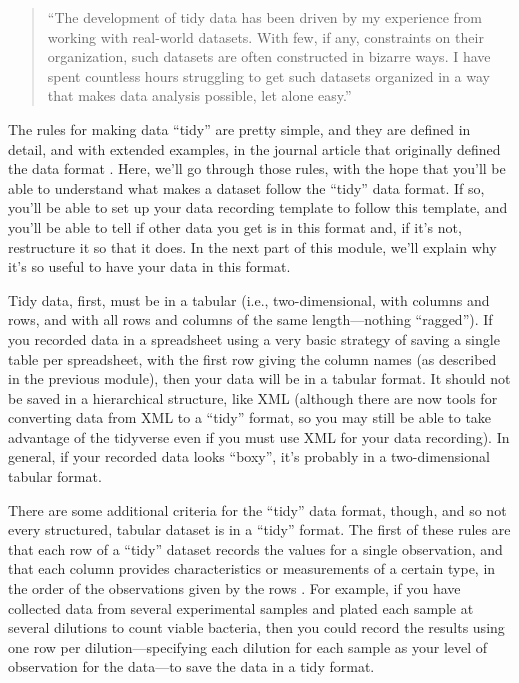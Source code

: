 \documentclass[]{tufte-book}
\begin{document}
\begin{quote}
``The development of tidy data has been driven by my experience from working
with real-world datasets. With few, if any, constraints on their organization,
such datasets are often constructed in bizarre ways. I have spent countless
hours struggling to get such datasets organized in a way that makes data
analysis possible, let alone easy.'' \citep{wickham2014tidy}
\end{quote}

The rules for making data ``tidy'' are pretty simple, and they are defined in
detail, and with extended examples, in the journal article that originally
defined the data format \citep{wickham2014tidy}. Here, we'll go through those rules, with
the hope that you'll be able to understand what makes a dataset follow the
``tidy'' data format. If so, you'll be able to set up your data recording
template to follow this template, and you'll be able to tell if other data you
get is in this format and, if it's not, restructure it so that it does. In
the next part of this module, we'll explain why it's so useful to have your
data in this format.

Tidy data, first, must be in a tabular (i.e., two-dimensional, with columns and
rows, and with all rows and columns of the same length---nothing ``ragged''). If
you recorded data in a spreadsheet using a very basic strategy of saving a
single table per spreadsheet, with the first row giving the column names (as
described in the previous module), then your data will be in a tabular format.
It should not be saved in a hierarchical structure, like XML (although there are
now tools for converting data from XML to a ``tidy'' format, so you may still be
able to take advantage of the tidyverse even if you must use XML for your data
recording). In general, if your recorded data looks ``boxy'', it's probably in a
two-dimensional tabular format.

There are some additional criteria for the ``tidy'' data format, though, and so
not every structured, tabular dataset is in a ``tidy'' format. The first of these
rules are that each row of a ``tidy'' dataset records the values for a single
observation, and that each column provides characteristics or measurements of a
certain type, in the order of the observations given by the rows
\citep{wickham2014tidy}. For example, if you have collected data from several
experimental samples and plated each sample at several dilutions to count
viable bacteria, then you could record the results using one row per
dilution---specifying each dilution for each sample as your level of
observation for the data---to save the data in a tidy format.
\end{document}
